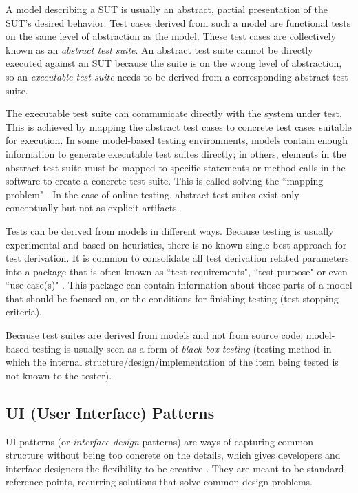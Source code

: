 A model describing a SUT is usually an abstract, partial presentation of the SUT's desired behavior. Test cases derived from such a model are functional tests on the same level of abstraction as the model. These test cases are collectively known as an \textit{abstract test suite}. An abstract test suite cannot be directly executed against an SUT because the suite is on the wrong level of abstraction, so an \textit{executable test suite} needs to be derived from a corresponding abstract test suite. 

The executable test suite can communicate directly with the system under test. This is achieved by mapping the abstract test cases to concrete test cases suitable for execution. In some model-based testing environments, models contain enough information to generate executable test suites directly; in others, elements in the abstract test suite must be mapped to specific statements or method calls in the software to create a concrete test suite. This is called solving the ``mapping problem" \cite{ammann2008introduction}. In the case of online testing, abstract test suites exist only conceptually but not as explicit artifacts.

Tests can be derived from models in different ways. Because testing is usually experimental and based on heuristics, there is no known single best approach for test derivation. It is common to consolidate all test derivation related parameters into a package that is often known as ``test requirements", ``test purpose" or even ``use case(s)" \cite{ammann2008introduction}. This package can contain information about those parts of a model that should be focused on, or the conditions for finishing testing (test stopping criteria).

Because test suites are derived from models and not from source code, model-based testing is usually seen as a form of \textit{black-box testing} (testing method in which the internal structure/design/implementation of the item being tested is not known to the tester).

\subsection{UI (User Interface) Patterns}
UI patterns (or \textit{interface design} patterns) are ways of capturing common structure without being too concrete on the details, which gives developers and interface designers the flexibility to be creative \cite{tidwell2010designing}. They are meant to be standard reference points, recurring solutions that solve common design problems. 

